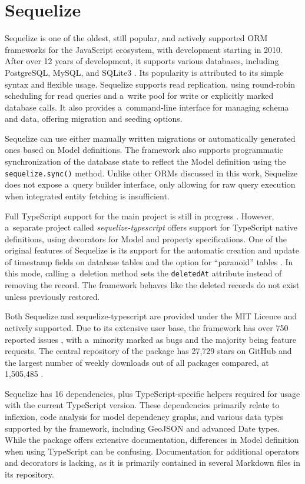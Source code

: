\section{Sequelize}

Sequelize is one of the oldest, still popular, and actively supported ORM
frameworks for the JavaScript ecosystem, with development starting in 2010.
After over 12 years of development, it supports various databases, including
PostgreSQL, MySQL, and SQLite3 \cite{sequelizeDocs}. Its popularity is
attributed to its simple syntax and flexible usage. Sequelize supports read
replication, using round-robin scheduling for read queries and a~write pool for
write or explicitly marked database calls. It also provides a~command-line
interface for managing schema and data, offering migration and seeding options.

Sequelize can use either manually written migrations or automatically generated
ones based on Model definitions. The framework also supports programmatic
synchronization of the database state to reflect the Model definition using the
\texttt{sequelize.sync()} method. Unlike other ORMs discussed in this work,
Sequelize does not expose a~query builder interface, only allowing for raw query
execution when integrated entity fetching is insufficient.

Full TypeScript support for the main project is still in progress
\cite{sequelizeTypescriptSupport}. However, a~separate project called
\textit{sequelize-typescript} \cite{sequelizeTypescriptNpm} offers support for
TypeScript native definitions, using decorators for Model and property
specifications. One of the original features of Sequelize is its support for the
automatic creation and update of timestamp fields on database tables and the
option for \enquote{paranoid} tables \cite{sequelizeParanoid}. In this mode,
calling a~deletion method sets the \texttt{deletedAt} attribute instead of
removing the record. The framework behaves like the deleted records do not exist
unless previously restored.

Both Sequelize and sequelize-typescript are provided under the MIT Licence and
actively supported. Due to its extensive user base, the framework has over 750
reported issues \cite{sequelizeGitHub}, with a~minority marked as bugs and the
majority being feature requests. The central repository of the package has
27,729 stars on GitHub and the largest number of weekly downloads out of all
packages compared, at 1,505,485 \cite{sequelizeNpm}.

Sequelize has 16 dependencies, plus TypeScript-specific helpers required for
usage with the current TypeScript version. These dependencies primarily relate
to inflexion, code analysis for model dependency graphs, and various data types
supported by the framework, including GeoJSON and advanced Date types. While the
package offers extensive documentation, differences in Model definition when
using TypeScript can be confusing. Documentation for additional operators and
decorators is lacking, as it is primarily contained in several Markdown files in
its repository.

